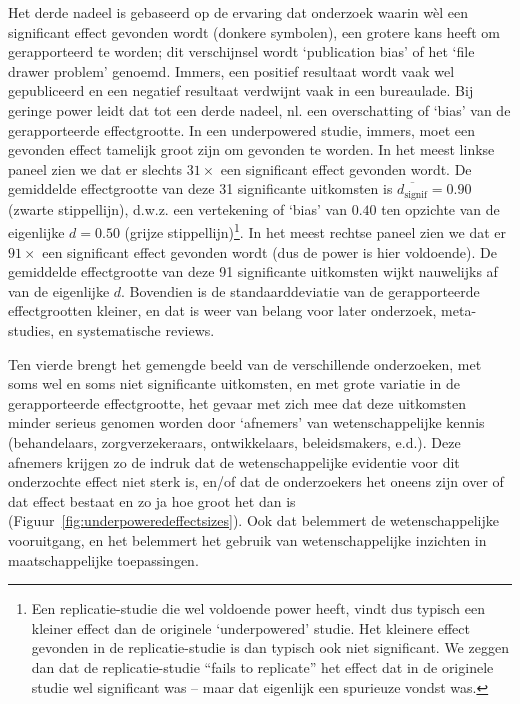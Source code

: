 \documentclass[
]{book}
\begin{document}
Het derde nadeel is gebaseerd op de ervaring dat onderzoek waarin wèl
een significant effect gevonden wordt (donkere symbolen), een grotere
kans heeft om gerapporteerd te worden; dit verschijnsel wordt
`publication bias' of het `file drawer problem' genoemd. Immers, een
positief resultaat wordt vaak wel gepubliceerd en een negatief resultaat
verdwijnt vaak in een bureaulade. Bij geringe power leidt dat tot een
derde nadeel, nl. een overschatting of `bias' van de gerapporteerde
effectgrootte. In een underpowered studie, immers, moet een gevonden
effect tamelijk groot zijn om gevonden te worden. In het meest linkse
paneel zien we dat er slechts \(31\times\) een significant effect gevonden
wordt. De gemiddelde effectgrootte van deze 31 significante uitkomsten
is \(\overline{d_{\textrm{signif}}}=0.90\) (zwarte stippellijn), d.w.z.
een vertekening of `bias' van \(0.40\) ten opzichte van de eigenlijke
\(d=0.50\) (grijze stippellijn)\footnote{Een replicatie-studie die wel voldoende power heeft, vindt dus typisch een kleiner effect dan de originele `underpowered' studie. Het kleinere effect gevonden in de replicatie-studie is dan typisch ook niet significant. We zeggen dan dat de replicatie-studie ``fails to replicate'' het effect dat in de originele studie wel significant was -- maar dat eigenlijk een spurieuze vondst was.}. In het meest rechtse paneel zien we dat
er \(91\times\) een significant effect gevonden wordt (dus de power is
hier voldoende). De gemiddelde effectgrootte van deze 91 significante
uitkomsten wijkt nauwelijks af van de eigenlijke \(d\). Bovendien is de
standaarddeviatie van de gerapporteerde effectgrootten kleiner, en dat
is weer van belang voor later onderzoek, meta-studies, en systematische
reviews.

Ten vierde brengt het gemengde beeld van de verschillende onderzoeken,
met soms wel en soms niet significante uitkomsten, en met grote variatie
in de gerapporteerde effectgrootte, het gevaar met zich mee dat deze
uitkomsten minder serieus genomen worden door `afnemers' van
wetenschappelijke kennis (behandelaars, zorgverzekeraars, ontwikkelaars,
beleidsmakers, e.d.). Deze afnemers krijgen zo de indruk dat de
wetenschappelijke evidentie voor dit onderzochte effect niet sterk is,
en/of dat de onderzoekers het oneens zijn over of dat effect bestaat en
zo ja hoe groot het dan is \citep{Kolf93} (Figuur~\ref{fig:underpoweredeffectsizes}).
Ook dat belemmert de
wetenschappelijke vooruitgang, en het belemmert het gebruik van
wetenschappelijke inzichten in maatschappelijke toepassingen.
\end{document}
